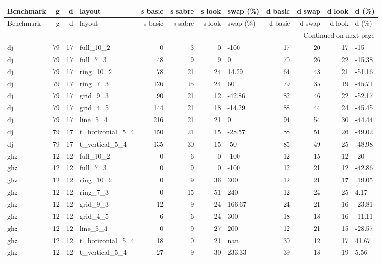 \begin{longtable}{lrrlrrrlrrrl}
\toprule
Benchmark & g & d & layout & s basic & s sabre & s look & swap (\%) & d basic & d swap & d look & d (\%) \\
\midrule
\endfirsthead
\toprule
Benchmark & g & d & layout & s basic & s sabre & s look & swap (\%) & d basic & d swap & d look & d (\%) \\
\midrule
\endhead
\midrule
\multicolumn{12}{r}{Continued on next page} \\
\midrule
\endfoot
\bottomrule
\endlastfoot
dj & 79 & 17 & full\_10\_2 & 0 & 3 & 0 & -100 & 17 & 20 & 17 & -15 \\
dj & 79 & 17 & full\_7\_3 & 48 & 9 & 9 & 0 & 70 & 26 & 22 & -15.38 \\
dj & 79 & 17 & ring\_10\_2 & 78 & 21 & 24 & 14.29 & 64 & 43 & 21 & -51.16 \\
dj & 79 & 17 & ring\_7\_3 & 126 & 15 & 24 & 60 & 79 & 35 & 19 & -45.71 \\
dj & 79 & 17 & grid\_9\_3 & 90 & 21 & 12 & -42.86 & 82 & 46 & 22 & -52.17 \\
dj & 79 & 17 & grid\_4\_5 & 144 & 21 & 18 & -14.29 & 88 & 44 & 24 & -45.45 \\
dj & 79 & 17 & line\_5\_4 & 216 & 21 & 21 & 0 & 94 & 54 & 30 & -44.44 \\
dj & 79 & 17 & t\_horizontal\_5\_4 & 150 & 21 & 15 & -28.57 & 88 & 51 & 26 & -49.02 \\
dj & 79 & 17 & t\_vertical\_5\_4 & 135 & 30 & 15 & -50 & 85 & 49 & 25 & -48.98 \\
ghz & 12 & 12 & full\_10\_2 & 0 & 6 & 0 & -100 & 12 & 15 & 12 & -20 \\
ghz & 12 & 12 & full\_7\_3 & 0 & 9 & 0 & -100 & 12 & 21 & 12 & -42.86 \\
ghz & 12 & 12 & ring\_10\_2 & 0 & 9 & 36 & 300 & 12 & 21 & 17 & -19.05 \\
ghz & 12 & 12 & ring\_7\_3 & 0 & 15 & 51 & 240 & 12 & 24 & 25 & 4.17 \\
ghz & 12 & 12 & grid\_9\_3 & 12 & 9 & 24 & 166.67 & 24 & 21 & 16 & -23.81 \\
ghz & 12 & 12 & grid\_4\_5 & 6 & 6 & 24 & 300 & 18 & 18 & 16 & -11.11 \\
ghz & 12 & 12 & line\_5\_4 & 0 & 9 & 27 & 200 & 12 & 21 & 15 & -28.57 \\
ghz & 12 & 12 & t\_horizontal\_5\_4 & 18 & 0 & 21 & nan & 30 & 12 & 17 & 41.67 \\
ghz & 12 & 12 & t\_vertical\_5\_4 & 27 & 9 & 30 & 233.33 & 39 & 18 & 19 & 5.56 \\

\end{longtable}
